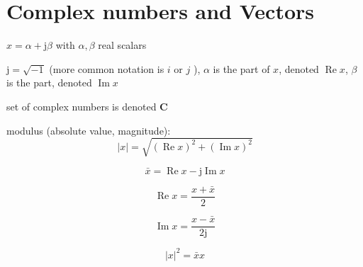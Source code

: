 \section{Complex numbers and Vectors}

\begin{definition}
    $ x=\alpha+\mathrm{j} \beta $ with $ \alpha, \beta $ real scalars

    $ \mathrm{j}=\sqrt{-1} $ (more common notation is $ i $ or $ j $ ), $ \alpha $ is the  part of $ x $, denoted $ \operatorname{Re} x $, $ \beta $ is the  part, denoted $ \operatorname{Im} x $
\end{definition}

\begin{definition}
    set of complex numbers is denoted $ \mathbf{C} $
\end{definition}

\begin{definition}[Modulus]
    modulus (absolute value, magnitude): \begin{equation} |x|=\sqrt{(\operatorname{Re} x)^{2}+(\operatorname{Im} x)^{2}} \end{equation}
\end{definition}

\begin{definition}[Conjugate]
    \begin{equation} \bar{x}=\operatorname{Re} x-\mathrm{j} \operatorname{Im} x \end{equation}
\end{definition}

\begin{theorem}
    \begin{equation} \operatorname{Re} x=\frac{x+\bar{x}}{2} \end{equation}
\end{theorem}

\begin{theorem}
    \begin{equation} \operatorname{Im} x=\frac{x-\bar{x}}{2 \mathrm{j}} \end{equation}
\end{theorem}

\begin{theorem}
    \begin{equation} |x|^{2}=\bar{x} x \end{equation}
\end{theorem}

